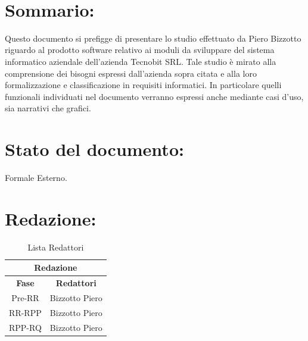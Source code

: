 \newpage


\begin{center} %
	\begin{Huge}	
				\textbf{\TITOLODOC}
			\\
	\end{Huge}
\end{center}
\parindent=18pt %
\section*{\LARGE Sommario:} %
Questo documento si prefigge di presentare lo studio effettuato da Piero Bizzotto riguardo al prodotto software relativo ai moduli da sviluppare del sistema informatico aziendale dell'azienda Tecnobit SRL.
Tale studio \`e mirato alla comprensione dei bisogni espressi dall'azienda sopra citata e alla loro formalizzazione e classificazione in requisiti informatici. In particolare quelli funzionali individuati nel documento verranno espressi anche mediante casi d'uso, sia narrativi che grafici. 

\section*{\LARGE Stato del documento:}
	Formale Esterno.
\hangindent=0pt

\section*{\LARGE Redazione:}
	\begin{table}[!h]
		\begin{center}
			\begin{tabular}
				{|c|c|}
				\hline
				\multicolumn{2}{|c|}{ \textbf{Redazione} } \\
				\hline
				\textbf{Fase} & \textbf{Redattori} \\
				\hline
				\multirow{1}{*}{Pre-RR} & Bizzotto Piero\\
										
				\hline
				\multirow{1}{*}{RR-RPP} & Bizzotto Piero\\
                                        
										
				\hline
				\multirow{1}{*}{RPP-RQ} & Bizzotto Piero\\
                                      
													\hline
			\end{tabular}
			\caption{Lista Redattori} %
			\label{tabredazione}
		\end{center}
	\end{table}	

